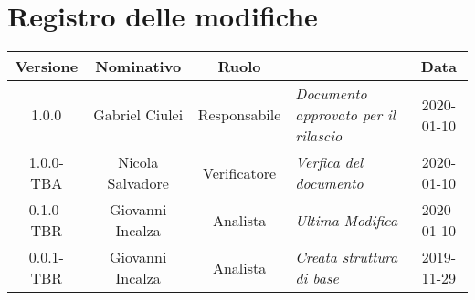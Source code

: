 \section*{Registro delle modifiche}
\renewcommand{\arraystretch}{1.8}

    \begin{longtable}{|c|c|c|p{3.8cm}|c|}
        \hline
        \rowcolor{header}
        \textbf{Versione} & \textbf{Nominativo} & \textbf{Ruolo} & \centering{\textbf{Descrizione}} & \textbf{Data} \\
        \hline
        1.0.0 & Gabriel Ciulei & Responsabile & \small{\textit{ Documento approvato per il rilascio }} & 2020-01-10\\
        1.0.0-TBA & Nicola Salvadore & Verificatore & \small{\textit{ Verfica del documento }} & 2020-01-10\\
        0.1.0-TBR & Giovanni Incalza & Analista & \small{\textit{ Ultima Modifica }} & 2020-01-10\\
        0.0.1-TBR & Giovanni Incalza & Analista & \small{\textit{ Creata struttura di base }} & 2019-11-29\\
        \hline
    \end{longtable}
